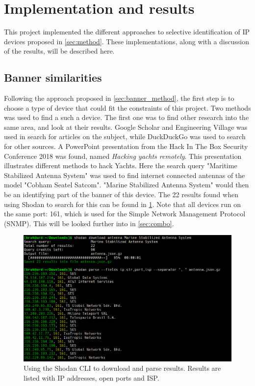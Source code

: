 \section{Implementation and results} \label{sec:results}
This project implemented the different approaches to selective identification of IP devices proposed in \cref{sec:method}. These implementations, along with a discussion of the results, will be described here. 


\subsection{Banner similarities} \label{sec:banner_results}
Following the approach proposed in \cref{sec:banner_method}, the first step is to choose a type of device that could fit the constraints of this project. Two methods was used to find a such a device. The first one was to find other research into the same area, and look at their results. Google Scholar\cite{google_scholar} and Engineering Village\cite{engineering_village} was used in search for articles on the subject, while DuckDuckGo\cite{ddg} was used to search for other sources. A PowerPoint presentation from the Hack In The Box Security Conference 2018 was found, named \textit{Hacking yachts remotely}. This presentation illustrates different methods to hack Yachts. Here the search query "Maritime Stabilized Antenna System" was used to find internet connected antennas of the model "Cobham Seatel Satcom". 
"Marine Stabilized Antenna System" would then be an identifying part of the banner of this device. The 22 results found when using Shodan to search for this can be found in \cref{fig:banner_parsing}. Note that all devices run on the same port: 161, which is used for the Simple Network Management Protocol (SNMP). This will be looked further into in \cref{sec:combo}.

\begin{figure} [H]
    \centering
    \includegraphics[scale=0.4]{Figurer/banner_parsing.png}
    \caption{Using the Shodan CLI to download and parse results. Results are listed with IP addresses, open ports and ISP.}
    \label{fig:banner_parsing}
\end{figure}

